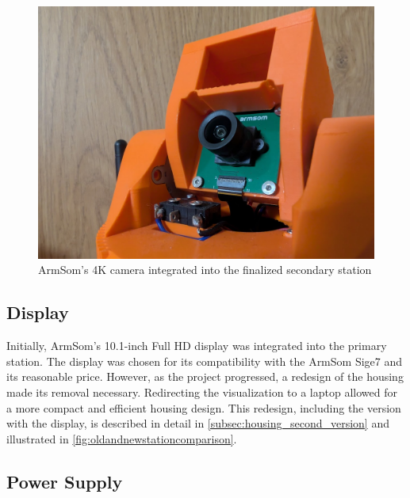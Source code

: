 \begin{figure}[H]
	\centering
	\includegraphics[width=1.0\linewidth]{figures/armsom_camera}
	\caption{ArmSom's 4K camera integrated into the finalized secondary station}
	\label{fig:armsomcamera}
\end{figure}

\subsection{Display}

Initially, ArmSom's 10.1-inch Full HD display \cite{armsom_display} was integrated into the primary station. The display was chosen for its compatibility with the ArmSom Sige7 \cite{armsom_sige7} and its reasonable price. However, as the project progressed, a redesign of the housing made its removal necessary. Redirecting the visualization to a laptop allowed for a more compact and efficient housing design. This redesign, including the version with the display, is described in detail in \autoref{subsec:housing_second_version} and illustrated in \autoref{fig:oldandnewstationcomparison}.

\subsection{Power Supply}

